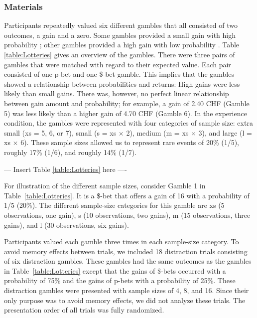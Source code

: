 \documentclass[a4paper,man, natbib]{apa6} %
\begin{document}
\subsubsection{Materials}
Participants repeatedly valued six different gambles that all consisted of two outcomes, a gain and a zero. Some gambles provided a small gain with high probability \citep[p-bet gamble type, notation following ][]{Lichtenstein1971} ; other gambles provided a high gain with low probability \citep[\$-bet gamble type, notation following ][]{Lichtenstein1971}. Table \ref{table:Lotteries} gives an overview of the gambles. There were three pairs of gambles that were matched with regard to their expected value. Each pair consisted of one p-bet and one \$-bet gamble. This implies that the gambles showed a relationship between probabilities and returns: High gains were less likely than small gains. There was, however, no perfect linear relationship between gain amount and probability; for example, a gain of 2.40 CHF (Gamble 5) was less likely than a higher gain of 4.70 CHF (Gamble 6). In the experience condition, the gambles were represented with four categories of sample size: extra small (xs = 5, 6, or 7), small (s = xs $\times$ 2), medium (m = xs $\times$ 3), and large (l = xs $\times$ 6). These sample sizes allowed us to represent rare events of 20\% (1/5), roughly 17\% (1/6), and roughly 14\% (1/7).  

\begin{center} --- Insert Table \ref{table:Lotteries} here ---- \end{center}


For illustration of the different sample sizes, consider Gamble 1 in Table~\ref{table:Lotteries}. It is a \$-bet that offers a gain of 16 with a probability of 1/5 (20\%). The different sample-size categories for this gamble are xs (5 observations, one gain), s (10 observations, two gains), m (15 observations, three gains), and l (30 observations, six gains). 

Participants valued each gamble three times in each sample-size category. To avoid memory effects between trials, we included 18 distraction trials consisting of six distraction gambles. These gambles had the same outcomes as the gambles in Table~\ref{table:Lotteries} except that the gains of \$-bets occurred with a probability of 75\% and the gains of p-bets with a probability of 25\%. These distraction gambles were presented with sample sizes of 4, 8, and 16. Since their only purpose was to avoid memory effects, we did not analyze these trials.
The presentation order of all trials was fully randomized.
\end{document}
